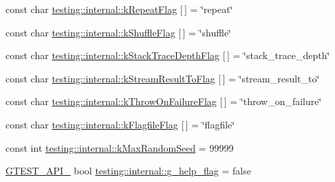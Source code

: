 \begin{DoxyCompactItemize}
\item 
const char \hyperlink{namespacetesting_1_1internal_a764ee423d39ebb8e10c53ab9b685cd9b}{testing\+::internal\+::k\+Repeat\+Flag} \mbox{[}$\,$\mbox{]} = \char`\"{}repeat\char`\"{}
\item 
const char \hyperlink{namespacetesting_1_1internal_affd2c1118505cb97d8ff728c95fc722b}{testing\+::internal\+::k\+Shuffle\+Flag} \mbox{[}$\,$\mbox{]} = \char`\"{}shuffle\char`\"{}
\item 
const char \hyperlink{namespacetesting_1_1internal_ad6f90e66d431ca3a9084408878c2cc77}{testing\+::internal\+::k\+Stack\+Trace\+Depth\+Flag} \mbox{[}$\,$\mbox{]} = \char`\"{}stack\+\_\+trace\+\_\+depth\char`\"{}
\item 
const char \hyperlink{namespacetesting_1_1internal_a84f8a2102d45c8b2b35be06d14ffefb8}{testing\+::internal\+::k\+Stream\+Result\+To\+Flag} \mbox{[}$\,$\mbox{]} = \char`\"{}stream\+\_\+result\+\_\+to\char`\"{}
\item 
const char \hyperlink{namespacetesting_1_1internal_ad9efcf363de3483afd91c7393a4fefb8}{testing\+::internal\+::k\+Throw\+On\+Failure\+Flag} \mbox{[}$\,$\mbox{]} = \char`\"{}throw\+\_\+on\+\_\+failure\char`\"{}
\item 
const char \hyperlink{namespacetesting_1_1internal_aa1ffe15dea227d4dded912e43a8eed84}{testing\+::internal\+::k\+Flagfile\+Flag} \mbox{[}$\,$\mbox{]} = \char`\"{}flagfile\char`\"{}
\item 
const int \hyperlink{namespacetesting_1_1internal_a41bd421ace53d23dbe85d9618c3afaee}{testing\+::internal\+::k\+Max\+Random\+Seed} = 99999
\item 
\hyperlink{gtest-port_8h_aa73be6f0ba4a7456180a94904ce17790}{G\+T\+E\+S\+T\+\_\+\+A\+P\+I\+\_\+} bool \hyperlink{namespacetesting_1_1internal_a93a772f5e51973b105d91cbb66a203f4}{testing\+::internal\+::g\+\_\+help\+\_\+flag} = false
\end{DoxyCompactItemize}
